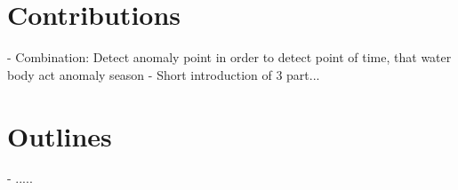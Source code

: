 



\section{Contributions} %

- Combination: Detect anomaly point in order to detect point of time, that water body act anomaly season
- Short introduction of 3 part...

\section{Outlines} %
- .....
